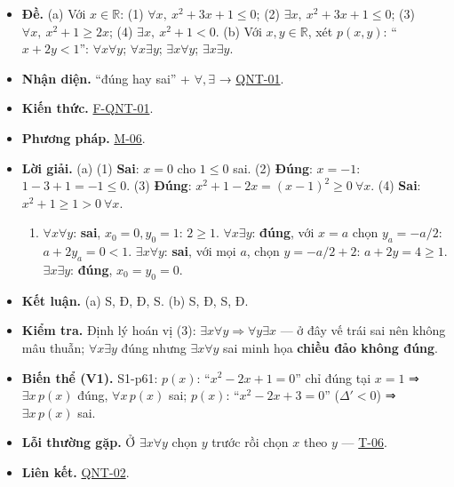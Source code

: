 \documentclass[
  10pt,
  twoside,openany]{book}
\providecommand{\tightlist}{%
  \setlength{\itemsep}{0pt}\setlength{\parskip}{0pt}}
\begin{document}
\begin{itemize}
\tightlist
\item
  \textbf{Đề.} (a) Với \(x\in\mathbb R\): (1)
  \(\forall x,\ x^2+3x+1\le0\); (2) \(\exists x,\ x^2+3x+1\le0\); (3)
  \(\forall x,\ x^2+1\ge2x\); (4) \(\exists x,\ x^2+1<0\). (b) Với
  \(x,y\in\mathbb R\), xét \(p(x,y)\): ``\(x+2y<1\)'':
  \(\forall x\forall y\); \(\forall x\exists y\);
  \(\exists x\forall y\); \(\exists x\exists y\).
\item
  \textbf{Nhận diện.} ``đúng hay sai'' + \(\forall,\exists\) →
  \protect\hyperlink{QNT-01}{QNT-01}.
\item
  \textbf{Kiến thức.} \protect\hyperlink{F-QNT-01}{F-QNT-01}.
\item
  \textbf{Phương pháp.} \protect\hyperlink{M-06}{M-06}.
\item
  \textbf{Lời giải.} (a) (1) \textbf{Sai}: \(x=0\) cho \(1\le0\) sai.
  (2) \textbf{Đúng}: \(x=-1\): \(1-3+1=-1\le0\). (3) \textbf{Đúng}:
  \(x^2+1-2x=(x-1)^2\ge0\ \forall x\). (4) \textbf{Sai}:
  \(x^2+1\ge1>0\ \forall x\).

  \begin{enumerate}
  \def\labelenumi{(\alph{enumi})}
  \setcounter{enumi}{1}
  \tightlist
  \item
    \(\forall x\forall y\): \textbf{sai}, \(x_0=0,y_0=1\): \(2\ge1\).
    \(\forall x\exists y\): \textbf{đúng}, với \(x=a\) chọn
    \(y_a=-a/2\): \(a+2y_a=0<1\). \(\exists x\forall y\): \textbf{sai},
    với mọi \(a\), chọn \(y=-a/2+2\): \(a+2y=4\ge1\).
    \(\exists x\exists y\): \textbf{đúng}, \(x_0=y_0=0\).
  \end{enumerate}
\item
  \textbf{Kết luận.} (a) S, Đ, Đ, S. (b) S, Đ, S, Đ.
\item
  \textbf{Kiểm tra.} Định lý hoán vị (3):
  \(\exists x\forall y\Rightarrow\forall y\exists x\) --- ở đây vế trái
  sai nên không mâu thuẫn; \(\forall x\exists y\) đúng nhưng
  \(\exists x\forall y\) sai minh họa \textbf{chiều đảo không đúng}.
\item
  \textbf{Biến thể (V1).} S1-p61: \(p(x)\): ``\(x^2-2x+1=0\)'' chỉ đúng
  tại \(x=1\) ⇒ \(\exists x\,p(x)\) đúng, \(\forall x\,p(x)\) sai;
  \(p(x)\): ``\(x^2-2x+3=0\)'' (\(\Delta'<0\)) ⇒ \(\exists x\,p(x)\)
  sai.
\item
  \textbf{Lỗi thường gặp.} Ở \(\exists x\forall y\) chọn \(y\) trước rồi
  chọn \(x\) theo \(y\) --- \protect\hyperlink{T-06}{T-06}.
\item
  \textbf{Liên kết.} \protect\hyperlink{QNT-02}{QNT-02}.
\end{itemize}
\end{document}
